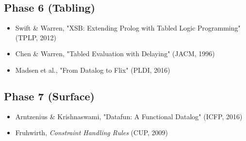 \documentclass[11pt]{article}
\begin{document}
\subsection{Phase 6 (Tabling)}
\label{sec:org213108f}
\begin{itemize}
\item Swift \& Warren, "XSB: Extending Prolog with Tabled Logic Programming" (TPLP, 2012)
\item Chen \& Warren, "Tabled Evaluation with Delaying" (JACM, 1996)
\item Madsen et al., "From Datalog to Flix" (PLDI, 2016)
\end{itemize}
\subsection{Phase 7 (Surface)}
\label{sec:org31dc8c5}
\begin{itemize}
\item Arntzenius \& Krishnaswami, "Datafun: A Functional Datalog" (ICFP, 2016)
\item Fruhwirth, \emph{Constraint Handling Rules} (CUP, 2009)
\end{itemize}
\end{document}
